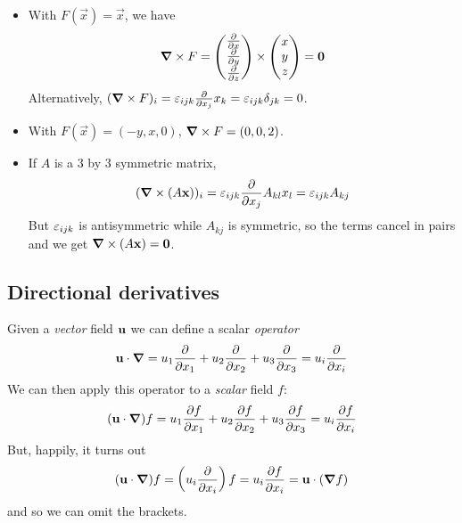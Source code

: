 \documentclass{../template/note}
\begin{document}
    \begin{example*}
        \begin{itemize}
            \item With \(F(\vec x) = \vec x\), we have
            \begin{align*}
                \curl F = \begin{pmatrix}
                 \pd{}{x} \\
                 \pd{}{y} \\
                 \pd{}{z} \\
                \end{pmatrix} \times \begin{pmatrix}
                 x \\
                 y \\
                 z \\
                \end{pmatrix} = \vec 0
            \end{align*}
            Alternatively, \((\curl F)_i = \lv{ijk} \pd{}{x_j} x_k = \lv{ijk}\delta_{jk} = 0\).
            \item With \(F(\vec x) = (-y, x, 0)\), \(\curl F = (0, 0, 2)\).
            \item If \(A\) is a 3 by 3 symmetric matrix,
            \begin{align*}
                (\curl (A \vec x))_i = \lv{ijk} \pd{}{x_j} A_{kl}x_l = \lv{ijk} A_{kj}
            \end{align*}
            But \(\varepsilon_{ijk}\) is antisymmetric while \(A_{kj}\) is symmetric, so the terms cancel in pairs and we get \(\curl (A \vec x) = \vec 0\).
        \end{itemize}
    \end{example*}
    
    \subsection{Directional derivatives}

    Given a \emph{vector} field \(\V u\) we can define a scalar \emph{operator}
    \begin{align*}
        \V u \cdot \grad = u_1 \pd{}{x_1} + u_2 \pd{}{x_2} + u_3 \pd{}{x_3} = u_i \pd{}{x_i}
    \end{align*}
    We can then apply this operator to a \emph{scalar} field \(f\):
    \begin{align*}
        (\V u \cdot \grad)f = u_1 \pd{f}{x_1} + u_2 \pd{f}{x_2} + u_3 \pd{f}{x_3} = u_i \pd{f}{x_i}
    \end{align*}
    But, happily, it turns out
    \begin{align*}
        (\V u \cdot \grad)f = \left(u_i \pd{}{x_i}\right)f = u_i \pd{f}{x_i} = \V u \cdot (\grad f)
    \end{align*}
    and so we can omit the brackets.
    
\end{document}
